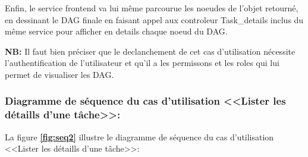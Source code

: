     \par Enfin, le service frontend va lui même parcourue les noeudes de l'objet retourné, en dessinant le DAG finale en faisant appel aux controleur Task\_details inclus du même service pour afficher en details chaque noeud du DAG.
    \par \textbf{NB:} Il faut bien préciser que le declanchement de cet cas d'utilisation nécessite l'authentification de l'utilisateur et qu'il a les permissons et les roles qui lui permet de visualiser les DAG.
    \subsubsection{Diagramme de séquence du cas d'utilisation <<Lister les détaills d'une tâche>>:}
    \par La figure \textbf{\ref*{fig:seq2}} illustre le diagramme de séquence du cas d'utilisation <<Lister les détaills d'une tâche>>:

